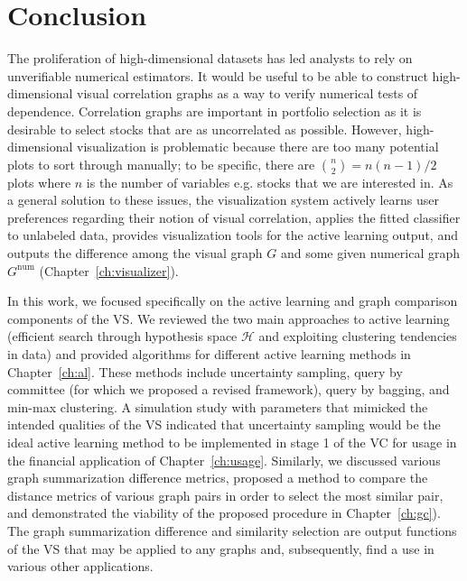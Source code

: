 \section{Conclusion}
\label{sec:conclusion}

The proliferation of high-dimensional datasets has led analysts to rely on 
unverifiable numerical estimators. It would be useful to be able to construct 
high-dimensional visual correlation graphs as a way to verify numerical 
tests of dependence. Correlation graphs are important in portfolio selection as 
it is desirable to select stocks that are as uncorrelated as 
possible. However, high-dimensional visualization is problematic because there 
are too many potential plots to sort through manually; to be 
specific, there are ${n\choose 2} = n(n-1)/2$  plots where $n$ is the number of 
variables e.g. stocks that we are interested in. As a general solution to these 
issues, the visualization system actively learns user preferences regarding 
their notion of visual correlation, applies 
the fitted classifier to unlabeled data, provides visualization tools for the 
active learning output, and outputs the difference among the visual graph $G$ 
and some given numerical graph $G^{\text{num}}$ (Chapter~\ref{ch:visualizer}).

In this work, we focused specifically on the active learning and graph 
comparison components of the VS. We reviewed the two main approaches to active 
learning (efficient search through hypothesis space $\mathcal{H}$ and 
exploiting clustering tendencies in data) and provided algorithms for 
different active learning methods in Chapter~\ref{ch:al}. These methods include 
uncertainty sampling, query by committee (for which we proposed a revised 
framework), query by bagging, and min-max clustering. A simulation study 
with parameters that mimicked the intended qualities of the VS indicated that 
uncertainty sampling would be the ideal active learning method to be 
implemented in stage 1 of the VC for usage in 
the financial application of Chapter~\ref{ch:usage}. Similarly, we discussed 
various graph summarization difference metrics, proposed a method to compare 
the distance metrics of various graph pairs in order to select the most 
similar pair, and demonstrated the viability of the proposed procedure in 
Chapter~\ref{ch:gc}). The graph summarization difference and similarity 
selection are output functions of the VS that may be applied to any graphs and, 
subsequently, find a use in various other applications.

